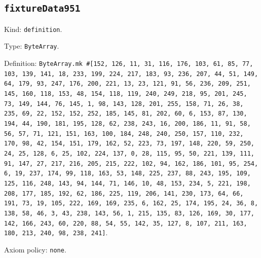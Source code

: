 \documentclass[11pt]{article}
\begin{document}
\subsection*{\texttt{fixtureData951}}
\noindent Kind: \texttt{definition}.\par
\noindent Type: \texttt{ByteArray}.\par
\noindent Definition: \texttt{ByteArray.mk \#[152, 126, 11, 31, 116, 176, 103, 61, 85, 77, 103, 139, 141, 18, 233, 199, 224, 217, 183, 93, 236, 207, 44, 51, 149, 64, 179, 93, 247, 176, 200, 221, 13, 23, 121, 91, 56, 236, 209, 251, 145, 160, 118, 153, 48, 154, 118, 119, 240, 249, 218, 95, 201, 245, 73, 149, 144, 76, 145, 1, 98, 143, 128, 201, 255, 158, 71, 26, 38, 235, 69, 22, 152, 152, 252, 185, 145, 81, 202, 60, 6, 153, 87, 130, 194, 44, 190, 181, 195, 128, 62, 238, 243, 16, 200, 186, 11, 91, 58, 56, 57, 71, 121, 151, 163, 100, 184, 248, 240, 250, 157, 110, 232, 170, 98, 42, 154, 151, 179, 162, 52, 223, 73, 197, 148, 220, 59, 250, 24, 25, 128, 6, 25, 102, 224, 137, 0, 28, 115, 95, 50, 221, 139, 111, 91, 147, 27, 217, 216, 205, 215, 222, 102, 94, 162, 186, 101, 95, 254, 6, 19, 237, 174, 99, 118, 163, 53, 148, 225, 237, 88, 243, 195, 109, 125, 116, 248, 143, 94, 144, 71, 146, 10, 48, 153, 234, 5, 221, 198, 208, 177, 185, 192, 62, 186, 225, 119, 206, 141, 230, 173, 64, 66, 191, 73, 19, 105, 222, 169, 169, 235, 6, 162, 25, 174, 195, 24, 36, 8, 138, 58, 46, 3, 43, 238, 143, 56, 1, 215, 135, 83, 126, 169, 30, 177, 142, 166, 243, 60, 220, 88, 54, 55, 142, 35, 127, 8, 107, 211, 163, 180, 213, 240, 98, 238, 241]}.\par
\noindent Axiom policy: \texttt{none}.\par
\end{document}
